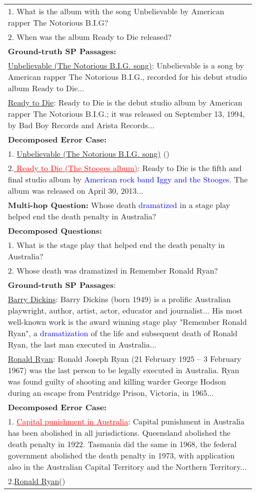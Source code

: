 \documentclass{article} \usepackage{iclr2021_conference,times}
\begin{document}
\begin{table*}[h]
\begin{tabular}{p{}}
    1. What is the album with the song Unbelievable by American rapper The Notorious B.I.G?\\
    2. When was the album Ready to Die released? \\
    \textbf{Ground-truth SP Passages:} \\
    \underline{Unbelievable (The Notorious B.I.G. song)}: Unbelievable is a song by American rapper The Notorious B.I.G., recorded for his debut studio album Ready to Die... \\
    \underline{Ready to Die}: Ready to Die is the debut studio album by American rapper The Notorious B.I.G.; it was released on September 13, 1994, by Bad Boy Records and Arista Records... \\
    \textbf{Decomposed Error Case:} \\
    1. \underline{Unbelievable (The Notorious B.I.G. song)} ()\\
    2.\textcolor{red}{\underline{ Ready to Die (The Stooges album)}}: Ready to Die is the fifth and final studio album by \textcolor{blue}{American rock band Iggy and the Stooges}. The album was released on April 30, 2013...\\
    \midrule
    \textbf{Multi-hop Question:} Whose death \textcolor{blue}{dramatized} in a stage play helped end the death penalty in Australia? \\
    \textbf{Decomposed Questions:} \\
    1. What is the stage play that helped end the death penalty in Australia?\\
    2. Whose death was dramatized in Remember Ronald Ryan?\\
    \textbf{Ground-truth SP Passages}:\\
    \underline{Barry Dickins}: Barry Dickins (born 1949) is a prolific Australian playwright, author, artist, actor, educator and journalist... His most well-known work is the award winning stage play "Remember Ronald Ryan", a \textcolor{blue}{dramatization} of the life and subsequent death of Ronald Ryan, the last man executed in Australia...\\
    \underline{Ronald Ryan}: Ronald Joseph Ryan (21 February 1925 – 3 February 1967) was the last person to be legally executed in Australia. Ryan was found guilty of shooting and killing warder George Hodson during an escape from Pentridge Prison, Victoria, in 1965...\\
    \textbf{Decomposed Error Case:}\\
    1. \textcolor{red}{\underline{Capital punishment in Australia}}: Capital punishment in Australia has been abolished in all jurisdictions. Queensland abolished the death penalty in 1922. Tasmania did the same in 1968, the federal government abolished the death penalty in 1973, with application also in the Australian Capital Territory and the Northern Territory...\\
    2.\underline{Ronald Ryan}()\\
    \bottomrule
    \end{tabular}
    \label{tab:decomposed_errors}
\end{table*}
\end{document}
